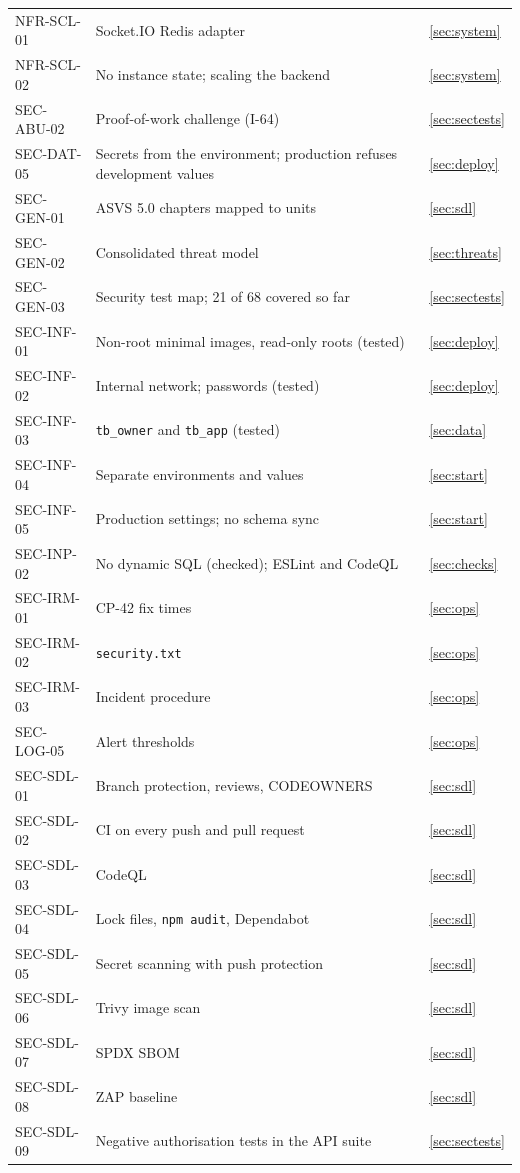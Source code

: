 \documentclass[11pt,a4paper]{article}
\begin{document}
{\begin{longtable}{@{}>{\ttfamily}p{2.4cm}>{\raggedright\arraybackslash}p{10.6cm}>{\raggedright\arraybackslash}p{2.2cm}@{}}
NFR-SCL-01 & Socket.IO Redis adapter & \ref{sec:system} \\
NFR-SCL-02 & No instance state; scaling the backend & \ref{sec:system} \\
SEC-ABU-02 & Proof-of-work challenge (I-64) & \ref{sec:sectests} \\
SEC-DAT-05 & Secrets from the environment; production refuses development values & \ref{sec:deploy} \\
SEC-GEN-01 & ASVS 5.0 chapters mapped to units & \ref{sec:sdl} \\
SEC-GEN-02 & Consolidated threat model & \ref{sec:threats} \\
SEC-GEN-03 & Security test map; 21 of 68 covered so far & \ref{sec:sectests} \\
SEC-INF-01 & Non-root minimal images, read-only roots (tested) & \ref{sec:deploy} \\
SEC-INF-02 & Internal network; passwords (tested) & \ref{sec:deploy} \\
SEC-INF-03 & \texttt{tb\_owner} and \texttt{tb\_app} (tested) & \ref{sec:data} \\
SEC-INF-04 & Separate environments and values & \ref{sec:start} \\
SEC-INF-05 & Production settings; no schema sync & \ref{sec:start} \\
SEC-INP-02 & No dynamic SQL (checked); ESLint and CodeQL & \ref{sec:checks} \\
SEC-IRM-01 & CP-42 fix times & \ref{sec:ops} \\
SEC-IRM-02 & \texttt{security.txt} & \ref{sec:ops} \\
SEC-IRM-03 & Incident procedure & \ref{sec:ops} \\
SEC-LOG-05 & Alert thresholds & \ref{sec:ops} \\
SEC-SDL-01 & Branch protection, reviews, CODEOWNERS & \ref{sec:sdl} \\
SEC-SDL-02 & CI on every push and pull request & \ref{sec:sdl} \\
SEC-SDL-03 & CodeQL & \ref{sec:sdl} \\
SEC-SDL-04 & Lock files, \texttt{npm audit}, Dependabot & \ref{sec:sdl} \\
SEC-SDL-05 & Secret scanning with push protection & \ref{sec:sdl} \\
SEC-SDL-06 & Trivy image scan & \ref{sec:sdl} \\
SEC-SDL-07 & SPDX SBOM & \ref{sec:sdl} \\
SEC-SDL-08 & ZAP baseline & \ref{sec:sdl} \\
SEC-SDL-09 & Negative authorisation tests in the API suite & \ref{sec:sectests} \\
\bottomrule
\end{longtable}}
\end{document}
